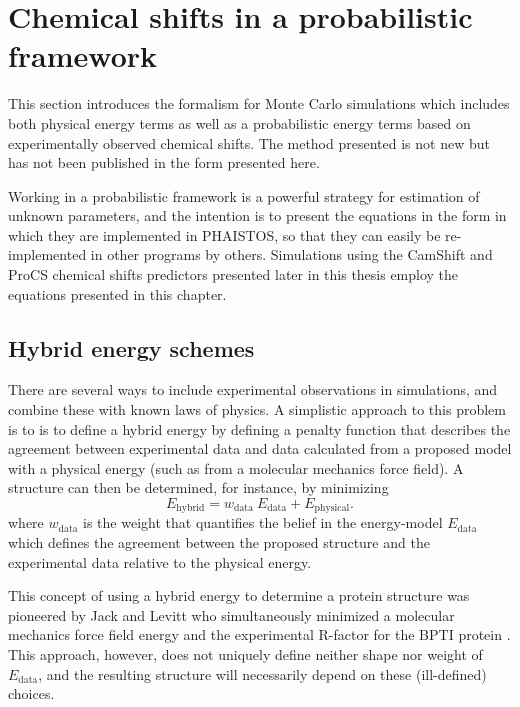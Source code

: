 \chapter{Chemical shifts in a probabilistic framework}

This section introduces the formalism for Monte Carlo simulations which includes both physical energy terms as well as a probabilistic energy terms based on experimentally observed chemical shifts.
The method presented is not new but has not been published in the form presented here.

Working in a probabilistic framework is a powerful strategy for estimation of unknown parameters, and the intention is to present the equations in the form in which they are implemented in PHAISTOS,  so that they can easily be re-implemented in other programs by others.
Simulations using the CamShift and ProCS chemical shifts predictors presented later in this thesis employ the equations presented in this chapter.

\section{Hybrid energy schemes}
There are several ways to include experimental observations in simulations, and combine these with known laws of physics.
A simplistic approach to this problem is to is to define a hybrid energy by defining a penalty function that describes the agreement between experimental data and data calculated from a proposed model with a physical energy (such as from a molecular mechanics force field).
A structure can then be determined, for instance, by minimizing
\begin{equation}
E_{\mathrm{hybrid}}= w_{\mathrm{data}}\ E_{\mathrm{data}}+E_{\mathrm{physical}}.
\label{eq:hybrid_definition}
\end{equation}
where $w_{\mathrm{data}}$ is the weight that quantifies the belief in the energy-model $E_{\mathrm{data}}$ which defines the agreement between the proposed structure and the experimental data relative to the physical energy.

This concept of using a hybrid energy to determine a protein structure was pioneered by Jack and Levitt who simultaneously minimized a molecular mechanics force field energy and the experimental R-factor for the BPTI protein \cite{JackLevitt}.
This approach, however, does not uniquely define neither shape nor weight of $E_{\mathrm{data}}$, and the resulting structure will necessarily depend on these (ill-defined) choices.

